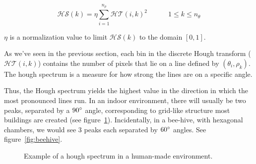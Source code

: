 \begin{equation}
\mathcal{HS}(k) = \eta \sum_{i=1}^{n_\rho} \mathcal{HT} (i, k) ^ 2 \qquad \quad 1 \leq k \leq n_\theta
\end{equation}

$\eta$ is a normalization value to limit $\mathcal{HS}(k)$ to the domain $[0, 1]$.

As we've seen in the previous section, each bin in the discrete Hough transform ($\mathcal{HT} (i, k)$) contains the number of pixels that lie on a line defined by $(\theta_i, \rho_k)$. The hough spectrum is a measure for how strong the lines are on a specific angle. 

Thus, the Hough spectrum yields the highest value in the direction in which the most pronounced lines run. In an indoor environment, there will usually be two peaks, separated by a $90\degree$ angle, corresponding to grid-like structure most buildings are created (see figure~\ref{fig:rooms}). Incidentally, in a bee-hive, with hexagonal chambers, we would see 3 peaks each separated by $60\degree$  angles. See figure~\ref{fig:beehive}.

\begin{figure}[ht]
\centering
{}
\caption{Example of a hough spectrum in a human-made environment.}
\label{fig:rooms}
\end{figure}

